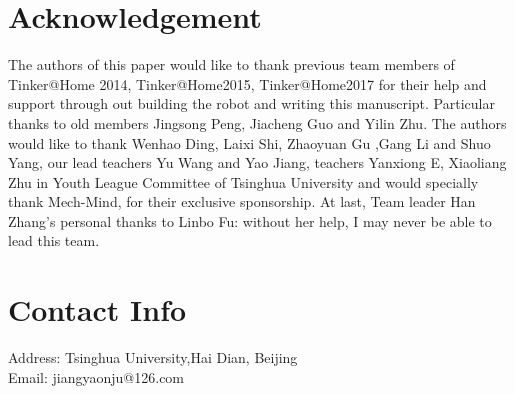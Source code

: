 \documentclass[runningheads,a4paper]{llncs}
\begin{document}


\section*{Acknowledgement}
The authors of this paper would like to thank previous team members of Tinker@Home 2014, Tinker@Home2015, Tinker@Home2017 for their help and support through out building the robot and writing this manuscript. Particular thanks to old members Jingsong Peng, Jiacheng Guo and Yilin Zhu.
 The authors would like to thank Wenhao Ding, Laixi Shi, Zhaoyuan Gu ,Gang Li and Shuo Yang, our lead teachers Yu Wang and Yao Jiang, teachers Yanxiong E, Xiaoliang Zhu in Youth League Committee of Tsinghua University and would specially thank Mech-Mind, for their exclusive sponsorship. At last, Team leader Han Zhang's personal thanks to Linbo Fu: without her help, I may never be able to lead this team.
\section*{Contact Info}

	\noindent
Address: Tsinghua University,Hai Dian, Beijing \\
Email: jiangyaonju@126.com 


%

\end{document}
